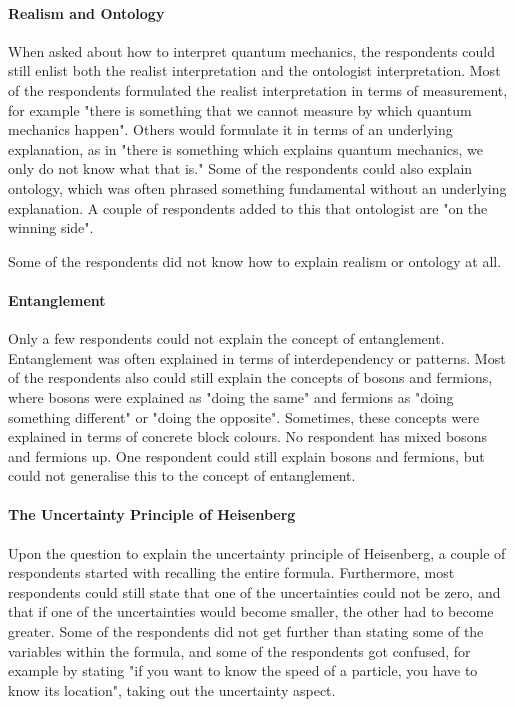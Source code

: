 \documentclass[11pt,twoside]{report} %
\begin{document}
\paragraph{Realism and Ontology}

When asked about how to interpret quantum mechanics, the respondents could still enlist both the realist interpretation and the ontologist interpretation. Most of the respondents formulated the realist interpretation in terms of measurement, for example "there is something that we cannot measure by which quantum mechanics happen". Others would formulate it in terms of an underlying explanation, as in "there is something which explains quantum mechanics, we only do not know what that is." Some of the respondents could also explain ontology, which was often phrased something fundamental without an underlying explanation. A couple of respondents added to this that ontologist are "on the winning side".

Some of the respondents did not know how to explain realism or ontology at all.

\paragraph{Entanglement}

Only a few respondents could not explain the concept of entanglement. Entanglement was often explained in terms of interdependency or patterns. Most of the respondents also could still explain the concepts of bosons and fermions, where bosons were explained as "doing the same" and fermions as "doing something different" or "doing the opposite". Sometimes, these concepts were explained in terms of concrete block colours. No respondent has mixed bosons and fermions up. One respondent could still explain bosons and fermions, but could not generalise this to the concept of entanglement.

\paragraph{The Uncertainty Principle of Heisenberg}

Upon the question to explain the uncertainty principle of Heisenberg, a couple of respondents started with recalling the entire formula. Furthermore, most respondents could still state that one of the uncertainties could not be zero, and that if one of the uncertainties would become smaller, the other had to become greater. Some of the respondents did not get further than stating some of the variables within the formula, and some of the respondents got confused, for example by stating "if you want to know the speed of a particle, you have to know its location", taking out the uncertainty aspect.
\end{document}
